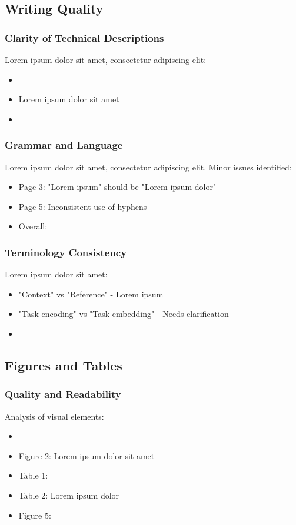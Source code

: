 \subsection{Writing Quality}
\subsubsection{Clarity of Technical Descriptions}
Lorem ipsum dolor sit amet, consectetur adipiscing elit:
\begin{itemize}
    \item {}
    \item Lorem ipsum dolor sit amet
    \item {}
\end{itemize}

\subsubsection{Grammar and Language}
Lorem ipsum dolor sit amet, consectetur adipiscing elit. Minor issues identified:
\begin{itemize}
    \item Page 3: "Lorem ipsum" should be "Lorem ipsum dolor"
    \item Page 5: Inconsistent use of hyphens
    \item Overall: 
\end{itemize}

\subsubsection{Terminology Consistency}
Lorem ipsum dolor sit amet:
\begin{itemize}
    \item "Context" vs "Reference" - Lorem ipsum
    \item "Task encoding" vs "Task embedding" - Needs clarification
    \item {}
\end{itemize}

\subsection{Figures and Tables}
\subsubsection{Quality and Readability}
Analysis of visual elements:
\begin{itemize}
    \item {}
    \item Figure 2: Lorem ipsum dolor sit amet
    \item Table 1: 
    \item Table 2: Lorem ipsum dolor
    \item Figure 5: 
\end{itemize}

